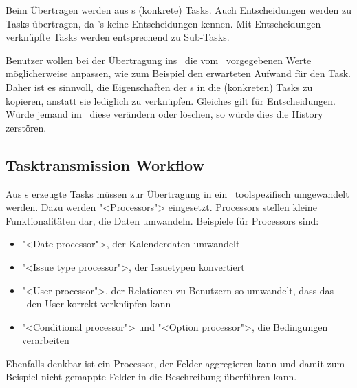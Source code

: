 				Beim Übertragen werden aus \ttpl s (konkrete) Tasks.
				Auch Entscheidungen werden zu Tasks übertragen, da \ppt's keine Entscheidungen kennen.
				Mit Entscheidungen verknüpfte Tasks werden entsprechend zu Sub-Tasks.
				
				Benutzer wollen bei der Übertragung ins \ppt\ die vom \ttpl\ vorgegebenen Werte möglicherweise anpassen, wie zum Beispiel den erwarteten Aufwand für den Task.
				Daher ist es sinnvoll, die Eigenschaften der \ttpl s in die (konkreten) Tasks zu kopieren, anstatt sie lediglich zu verknüpfen.
				Gleiches gilt für Entscheidungen. Würde jemand im \dks\ diese verändern oder löschen,
				so würde dies die History zerstören.
			
		
		\subsection{Tasktransmission Workflow}
			Aus \ttpl s erzeugte Tasks müssen zur Übertragung in ein \ppt\
			toolspezifisch umgewandelt werden. Dazu werden "<Processors"> eingesetzt.
			Processors stellen kleine Funktionalitäten dar, die Daten umwandeln.
			Beispiele für Processors sind:
			\begin{itemize}
				\item "<Date processor">, der Kalenderdaten umwandelt
				\item "<Issue type processor">, der Issuetypen konvertiert
				\item "<User processor">, der Relationen zu Benutzern so umwandelt, dass das \ppt\ den User korrekt verknüpfen kann
				\item "<Conditional processor"> und "<Option processor">, die Bedingungen verarbeiten
			\end{itemize}
			Ebenfalls denkbar ist ein Processor, der Felder aggregieren kann und damit zum Beispiel nicht gemappte Felder in die Beschreibung überführen kann.
			

